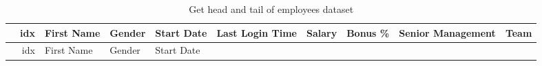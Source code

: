 \documentclass [oneside,10pt,a4paper,ngerman,BCOR10mm,headsepline,parindent,final]{scrartcl}
\begin{document}
    \begin{longtable}[]{@{}rrllllrrrl@{}}
\caption{Get head and tail of employees dataset}\tabularnewline
\toprule
\begin{minipage}[b]{0.03\columnwidth}\raggedleft
\strut
\end{minipage} & \begin{minipage}[b]{0.04\columnwidth}\raggedleft
idx\strut
\end{minipage} & \begin{minipage}[b]{0.08\columnwidth}\raggedright
First Name\strut
\end{minipage} & \begin{minipage}[b]{0.06\columnwidth}\raggedright
Gender\strut
\end{minipage} & \begin{minipage}[b]{0.08\columnwidth}\raggedright
Start Date\strut
\end{minipage} & \begin{minipage}[b]{0.10\columnwidth}\raggedright
Last Login Time\strut
\end{minipage} & \begin{minipage}[b]{0.06\columnwidth}\raggedleft
Salary\strut
\end{minipage} & \begin{minipage}[b]{0.06\columnwidth}\raggedleft
Bonus \%\strut
\end{minipage} & \begin{minipage}[b]{0.12\columnwidth}\raggedleft
Senior Management\strut
\end{minipage} & \begin{minipage}[b]{0.12\columnwidth}\raggedright
Team\strut
\end{minipage}\tabularnewline
\midrule
\endfirsthead
\toprule
\begin{minipage}[b]{0.03\columnwidth}\raggedleft
\strut
\end{minipage} & \begin{minipage}[b]{0.04\columnwidth}\raggedleft
idx\strut
\end{minipage} & \begin{minipage}[b]{0.08\columnwidth}\raggedright
First Name\strut
\end{minipage} & \begin{minipage}[b]{0.06\columnwidth}\raggedright
Gender\strut
\end{minipage} & \begin{minipage}[b]{0.08\columnwidth}\raggedright
Start Date\strut
\end{minipage} & \begin{minipage}[b]{0.10\columnwidth}\raggedright

\end{minipage}
\end{longtable}
\end{document}
